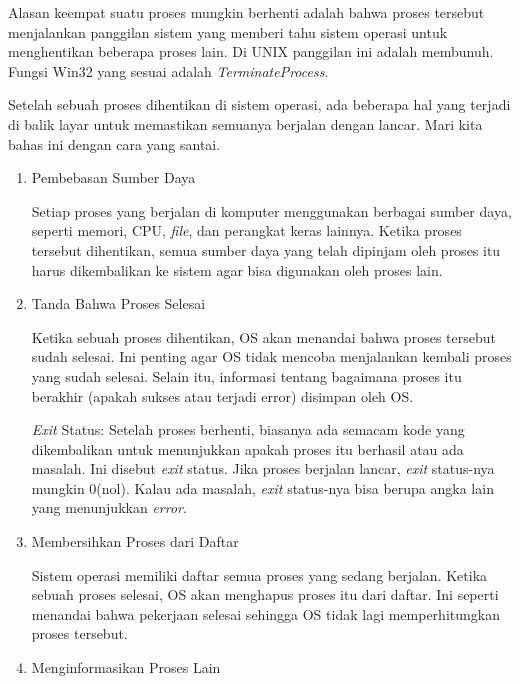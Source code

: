 \documentclass[12pt]{article}
\begin{document}
\begin{itemize}
    Alasan keempat suatu proses mungkin berhenti adalah bahwa proses 
    tersebut menjalankan panggilan sistem yang memberi tahu sistem operasi untuk 
    menghentikan beberapa proses lain. Di UNIX panggilan ini adalah membunuh. 
    Fungsi Win32 yang sesuai adalah \textit{TerminateProcess}.

    Setelah sebuah proses dihentikan di sistem operasi, ada beberapa hal yang terjadi di balik layar untuk memastikan semuanya berjalan dengan lancar. Mari kita bahas ini dengan cara yang santai.
    \begin{enumerate}
        \item Pembebasan Sumber Daya
        

        Setiap proses yang berjalan di komputer 
        menggunakan berbagai sumber daya, seperti 
        memori, CPU, \textit{file}, dan perangkat keras lainnya. 
        Ketika proses tersebut dihentikan, semua sumber daya 
        yang telah dipinjam oleh proses itu harus dikembalikan ke 
        sistem agar bisa digunakan oleh proses lain. 
        \item Tanda Bahwa Proses Selesai
        

        Ketika sebuah proses dihentikan, OS akan menandai bahwa 
        proses tersebut sudah selesai. Ini penting agar OS tidak 
        mencoba menjalankan kembali proses yang sudah selesai. 
        Selain itu, informasi tentang bagaimana proses itu berakhir 
        (apakah sukses atau terjadi error) disimpan oleh OS.

        \textit{Exit} Status: Setelah proses berhenti, biasanya ada 
        semacam kode yang dikembalikan untuk menunjukkan 
        apakah proses itu berhasil atau ada masalah. Ini disebut 
        \textit{exit} status. Jika proses berjalan lancar, \textit{exit} status-nya 
        mungkin 0(nol). Kalau ada masalah, \textit{exit} status-nya bisa berupa 
        angka lain yang menunjukkan \textit{error}.

        \item Membersihkan Proses dari Daftar
        

        Sistem operasi memiliki daftar semua proses yang sedang 
        berjalan. Ketika sebuah proses selesai, OS akan menghapus 
        proses itu dari daftar. Ini seperti menandai bahwa pekerjaan 
        selesai sehingga OS tidak lagi memperhitungkan proses 
        tersebut.

        \item  Menginformasikan Proses Lain
        


\end{enumerate}
\end{itemize}
\end{document}
